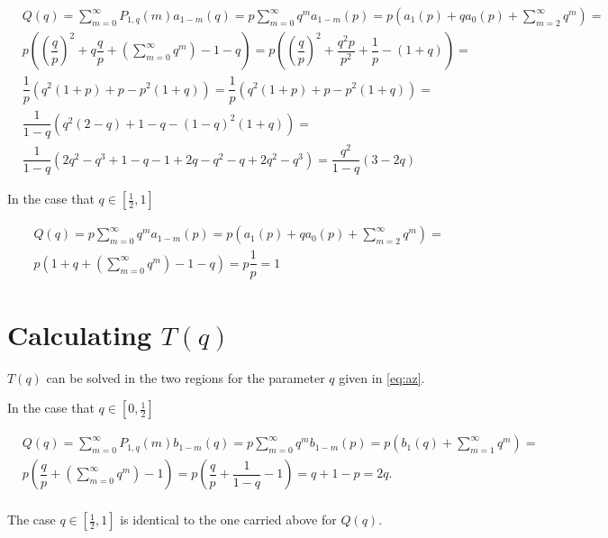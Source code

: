 \documentclass[letterpaper,12pt]{report}
\theoremstyle{plain}
\theoremstyle{definition}
\begin{document}
\begin{eqnarray}\label{eq:rpcalc}\nonumber
&\mathit{Q}(q)=\sum_{m=0}^{\infty}\mathit{P}_{1,q}(m)\mathit{a}_{1-m}(q)=p\sum_{m=0}^{\infty}q^m\mathit{a}_{1-m}(p)=p\left(
\mathit{a}_1(p)+q\mathit{a}_0(p)+\sum_{m=2}^{\infty}q^m
 \right)=\\\nonumber
 &p\left(
\left(\dfrac{q}{p}\right)^2+q\dfrac{q}{p}+\left(\sum_{m=0}^{\infty}q^m\right)-1-q
 \right) 
 =p\left(
\left(\dfrac{q}{p}\right)^2+\dfrac{q^2p}{p^2}+\dfrac{1}{p}-(1+q)
 \right)=\\\nonumber
&\dfrac{1}{p}\left(
q^2(1+p)+p-p^2(1+q)
\right) 
 =\dfrac{1}{p}
\left(q^2(1+p)+p-p^2(1+q)
 \right)=\\\nonumber
&\dfrac{1}{1-q}\left(
q^2(2-q)+1-q-(1-q)^2(1+q)
\right) 
 =\\\nonumber
 &\dfrac{1}{1-q}\left(
2q^2-q^3+1-q-1+2q-q^2 -q+2q^2-q^3
\right) = \dfrac{q^2}{1-q}\left(
3-2q
\right)
\end{eqnarray}

In the case  that $q\in [\frac{1}{2},1]$

\begin{eqnarray}\nonumber
&\mathit{Q}(q)=p\sum_{m=0}^{\infty}q^m\mathit{a}_{1-m}(p)=p\left(
\mathit{a}_1(p)+q\mathit{a}_0(p)+\sum_{m=2}^{\infty}q^m
 \right)=\\\nonumber
 &p
\left(1+q+\left(\sum_{m=0}^{\infty}q^m\right)-1-q
 \right) 
 =p\dfrac{1}{p}=1
\end{eqnarray}

\section{Calculating $\mathit{T}(q)$ } \label{app:calctofp} 

$\mathit{T}(q)$  can be solved in the two regions for the parameter $q$ given in \ref{eq:az}.

In the case  that $q\in [0,\frac{1}{2}]$

\begin{eqnarray}\label{eq:rpcalc}\nonumber
&\mathit{Q}(q)=\sum_{m=0}^{\infty}\mathit{P}_{1,q}(m)\mathit{b}_{1-m}(q)=p\sum_{m=0}^{\infty}q^m\mathit{b}_{1-m}(p)=p\left(
\mathit{b}_1(q)+\sum_{m=1}^{\infty}q^m
 \right)=\\\nonumber
 &p\left(
\dfrac{q}{p}+\left(\sum_{m=0}^{\infty}q^m\right)-1
 \right) 
 =p\left(
\dfrac{q}{p}+\dfrac{1}{1-q}-1
 \right)=q+1-p=2q.\\\nonumber
\end{eqnarray}

The case $q\in [\frac{1}{2},1]$ is identical to the one carried above for $\mathit{Q}(q)$.
\end{document}
